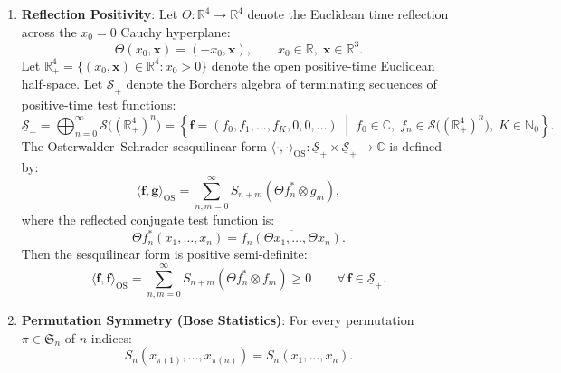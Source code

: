 \begin{axiom}
\begin{enumerate}
    \item[\textbf{OS2}] \textbf{Reflection Positivity}: Let $\Theta : \mathbb{R}^4 \to \mathbb{R}^4$ denote the Euclidean time reflection across the $x_0 = 0$ Cauchy hyperplane:
    \begin{equation}
    \label{eq:theta_reflection_map}
    \Theta(x_0, \mathbf{x}) = (-x_0, \mathbf{x}), \qquad x_0 \in \mathbb{R}, \; \mathbf{x} \in \mathbb{R}^3.
    \end{equation}
    Let $\mathbb{R}_+^4 = \{(x_0, \mathbf{x}) \in \mathbb{R}^4 : x_0 > 0\}$ denote the open positive-time Euclidean half-space. Let $\underline{\mathcal{S}}_+$ denote the Borchers algebra of terminating sequences of positive-time test functions:
    \begin{equation}
    \underline{\mathcal{S}}_+ = \bigoplus_{n=0}^\infty \mathcal{S}\bigl( (\mathbb{R}_+^4)^n \bigr) = \left\{ \mathbf{f} = (f_0, f_1, \dots, f_K, 0, 0, \dots) \;\middle|\; f_0 \in \mathbb{C}, \; f_n \in \mathcal{S}\bigl( (\mathbb{R}_+^4)^n \bigr), \; K \in \mathbb{N}_0 \right\}.
    \end{equation}
    The Osterwalder--Schrader sesquilinear form $\langle \cdot, \cdot \rangle_{\mathrm{OS}} : \underline{\mathcal{S}}_+ \times \underline{\mathcal{S}}_+ \to \mathbb{C}$ is defined by:
    \begin{equation}
    \label{eq:os_sesquilinear_form}
    \langle \mathbf{f}, \mathbf{g} \rangle_{\mathrm{OS}} = \sum_{n, m=0}^\infty S_{n+m}(\Theta f_n^* \otimes g_m),
    \end{equation}
    where the reflected conjugate test function is:
    \begin{equation}
    \label{eq:reflected_conjugate_test}
    \Theta f_n^*(x_1, \dots, x_n) = \overline{f_n(\Theta x_1, \dots, \Theta x_n)}.
    \end{equation}
    Then the sesquilinear form is positive semi-definite:
    \begin{equation}
    \label{eq:os2_positivity}
    \langle \mathbf{f}, \mathbf{f} \rangle_{\mathrm{OS}} = \sum_{n, m=0}^\infty S_{n+m}(\Theta f_n^* \otimes f_m) \ge 0 \qquad \forall \, \mathbf{f} \in \underline{\mathcal{S}}_+.
    \end{equation}

    \item[\textbf{OS3}] \textbf{Permutation Symmetry (Bose Statistics)}: For every permutation $\pi \in \mathfrak{S}_n$ of $n$ indices:
    \begin{equation}
    \label{eq:os3_symmetry}
    S_n(x_{\pi(1)}, \dots, x_{\pi(n)}) = S_n(x_1, \dots, x_n).
    \end{equation}


\end{enumerate}
\end{axiom}
